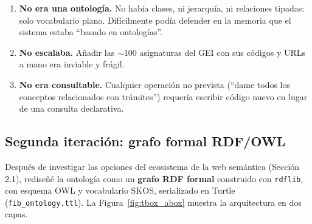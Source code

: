 \documentclass[12pt, a4paper, twoside]{report}
\begin{document}
\begin{enumerate}
  \item \textbf{No era una ontolog\'ia.} No hab\'ia clases, ni jerarqu\'ia, ni relaciones tipadas: solo vocabulario plano. Dif\'icilmente pod\'ia defender en la memoria que el sistema estaba ``basado en ontolog\'ias''.
  \item \textbf{No escalaba.} A\~nadir las $\sim$100 asignaturas del GEI con sus c\'odigos y URLs a mano era inviable y fr\'agil.
  \item \textbf{No era consultable.} Cualquier operaci\'on no prevista (``dame todos los conceptos relacionados con tr\'amites'') requer\'ia escribir c\'odigo nuevo en lugar de una consulta declarativa.
\end{enumerate}

\subsection{Segunda iteraci\'on: grafo formal RDF/OWL}

Despu\'es de investigar las opciones del ecosistema de la web sem\'antica (Secci\'on 2.1), redise\~n\'e la ontolog\'ia como un \textbf{grafo RDF formal} construido con \texttt{rdflib}, con esquema OWL y vocabulario SKOS, serializado en Turtle (\texttt{fib\_ontology.ttl}). La Figura~\ref{fig:tbox_abox} muestra la arquitectura en dos capas.
\end{document}
